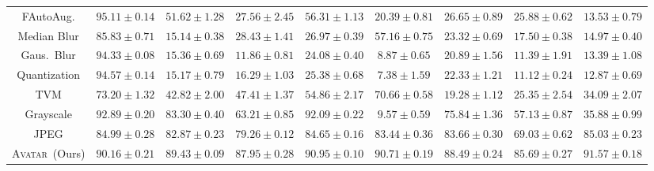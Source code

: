 \documentclass[conference]{IEEEtran}
\theoremstyle{definition}
\theoremstyle{remark}
\theoremstyle{proposition}
\begin{document}
\begin{table}[t!]
\begin{center}
\begin{small}
\begin{tabular}{ccccccccc}
                FAutoAug.                            & $95.11 \pm 0.14$ & $51.62 \pm 1.28$ & $27.56 \pm 2.45$ & $56.31 \pm 1.13$ & $20.39 \pm 0.81$ & $26.65 \pm 0.89$ & $25.88 \pm 0.62$ & $13.53 \pm 0.79$\\
                Median Blur                          & $85.83 \pm 0.71$ & $15.14 \pm 0.38$ & $28.43 \pm 1.41$ & $26.97 \pm 0.39$ & $57.16 \pm 0.75$ & $23.32 \pm 0.69$ & $17.50 \pm 0.38$ & $14.97 \pm 0.40$\\
                Gaus.~Blur                           & $94.33 \pm 0.08$ & $15.36 \pm 0.69$ & $11.86 \pm 0.81$ & $24.08 \pm 0.40$ & $8.87 \pm 0.65$  & $20.89 \pm 1.56$ & $11.39 \pm 1.91$ & $13.39 \pm 1.08$\\
                Quantization                         & $94.57 \pm 0.14$ & $15.17 \pm 0.79$ & $16.29 \pm 1.03$ & $25.38 \pm 0.68$ & $7.38 \pm 1.59$ & $22.33 \pm 1.21$ & $11.12 \pm 0.24$ & $12.87 \pm 0.69$\\
                TVM                                  & $73.20 \pm 1.32$ & $42.82 \pm 2.00$ & $47.41 \pm 1.37$ & $54.86 \pm 2.17$ & $70.66 \pm 0.58$ & $19.28 \pm 1.12$ & $25.35 \pm 2.54$ & $34.09 \pm 2.07$\\
                Grayscale                            & $92.89 \pm 0.20$ & $83.30 \pm 0.40$ & $63.21 \pm 0.85$ & $\mathbf{92.09 \pm 0.22}$  & $9.57 \pm 0.59$  & $75.84 \pm 1.36$ & $57.13 \pm 0.87$ & $35.88 \pm 0.99$\\
                JPEG                                 & $84.99 \pm 0.28$ & $82.87 \pm 0.23$ & $79.26 \pm 0.12$ & $84.65 \pm 0.16$ & $83.44 \pm 0.36$ & $83.66 \pm 0.30$ & $69.03 \pm 0.62$ & $85.03 \pm 0.23$\\
				\textsc{Avatar}~(Ours)               & $90.16 \pm 0.21$ & $\mathbf{89.43 \pm 0.09}$ & $\mathbf{87.95 \pm 0.28}$ & $90.95 \pm 0.10$ & $\mathbf{90.71 \pm 0.19}$ & $\mathbf{88.49 \pm 0.24}$ & $\mathbf{85.69 \pm 0.27}$ & $\mathbf{91.57 \pm 0.18}$\\
			    \bottomrule
			\end{tabular}
		\end{small}
	\end{center}
    \vskip -0.1in
\end{table}
\end{document}
